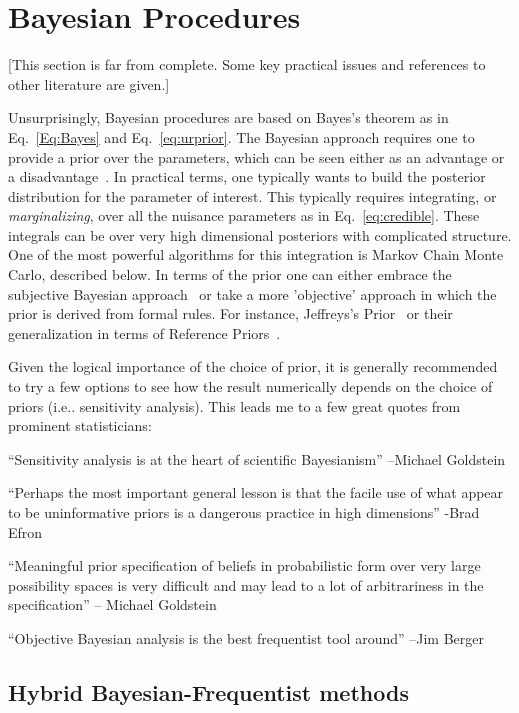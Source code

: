 \section{Bayesian Procedures}


[This section is far from complete.  Some key practical issues and references to other literature are given.]


Unsurprisingly, Bayesian procedures are based on Bayes's theorem as in Eq.~\ref{Eq:Bayes} and Eq.~\ref{eq:urprior}.  The Bayesian approach requires one to provide a prior over the parameters, which can be seen either as an advantage or a disadvantage~\cite{DAgostiniInference,Cousins:1994yw}.  In practical terms, one typically wants to build the posterior distribution for the parameter of interest.  This typically requires integrating, or \textit{marginalizing}, over all the nuisance parameters as in Eq.~\ref{eq:credible}.  These integrals can be over very high dimensional posteriors with complicated structure.  One of the most powerful algorithms for this integration is Markov Chain Monte Carlo, described below.  In terms of the prior one can either embrace the subjective Bayesian approach~\cite{Jaynes:2003fk} or take a more 'objective' approach in which the prior is derived from formal rules.  For instance, Jeffreys's Prior~\cite{JeffreysPrior} or their generalization in terms of Reference Priors~\cite{Demortier:2010sn}.  


Given the logical importance of the choice of prior, it is generally recommended to try a few options to see how the result numerically depends on the choice of priors (i.e.. sensitivity analysis).  This leads me to a few great quotes from prominent statisticians:


``Sensitivity analysis is at the heart of scientific Bayesianism'' --Michael Goldstein


``Perhaps the most important general lesson is that the facile use of what appear to be uninformative priors is a dangerous practice in high dimensions'' -Brad Efron


``Meaningful prior specification of beliefs in probabilistic form over very large possibility spaces is very difficult and may lead to a lot of arbitrariness in the specification'' -- Michael Goldstein


``Objective Bayesian analysis is the best frequentist tool around'' --Jim Berger


\subsection{Hybrid Bayesian-Frequentist methods}


